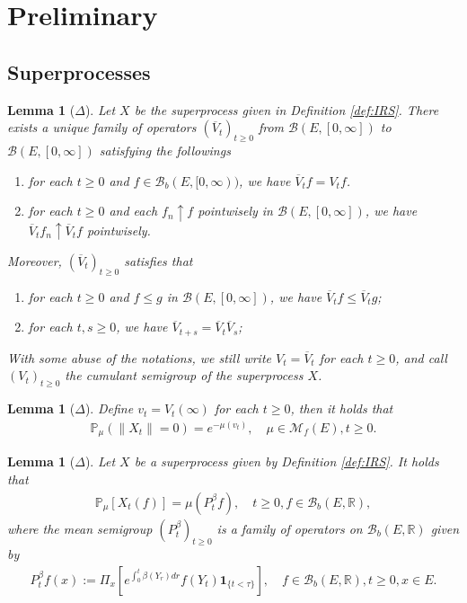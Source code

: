 \documentclass[12pt,a4paper]{amsart}
\numberwithin{equation}{section}
\theoremstyle{plain}
\newtheorem{lem}[thm]{Lemma}
\theoremstyle{definition}
\begin{document}
\section{Preliminary}
\subsection{Superprocesses}
  \begin{lem}[$\Delta$]
    \label{lem:ACP}
    Let $X$ be the superprocess given in Definition \ref{def:IRS}.
    There exists a unique family of operators $(\overline V_t)_{t \geq 0}$ from $\mathcal B(E, [0,\infty])$ to $\mathcal B(E, [0,\infty])$ satisfying the followings
    \begin{enumerate}[label=(\alph*)]
    \item
      for each $t\geq 0$ and $f \in \mathcal B_b(E, [0,\infty))$, we have $\overline V_tf = V_tf$.
    \item
      for each $t\geq 0$ and each $f_n \uparrow f$ pointwisely in $\mathcal B(E, [0,\infty])$, we have $\overline V_tf_n \uparrow \overline V_tf$ pointwisely.
    \end{enumerate}
    Moreover, $(\overline V_t)_{t\geq 0}$ satisfies that
    \begin{enumerate}
    \item
      for each $t\geq 0$ and $f\leq g$ in $\mathcal B(E,[0,\infty])$, we have $\overline V_tf \leq \overline V_tg$;
    \item
      for each $t, s\geq 0$, we have $\overline V_{t+s} = \overline V_t \overline V_s$;
    \end{enumerate}
    With some abuse of the notations, we still write $V_t = \overline V_t$ for each $t\geq 0$, and call $(V_t)_{t\geq 0}$ the \emph{cumulant semigroup} of the superprocess $X$.
  \end{lem}

  \begin{lem}[$\Delta$]
    \label{lem:PSE}
    Define $v_t = V_t(\infty)$ for each $t\geq 0$, then it holds that 
    \begin{align}
      \mathbb P_\mu (\|X_t\| = 0) 
      = e^{- \mu(v_t)}
      , \quad \mu \in \mathcal M_f(E), t\geq 0.
    \end{align}      
  \end{lem}
  
  \begin{lem}[$\Delta$]
    \label{lem:PSM}
    Let $X$ be a superprocess given by Definition \ref{def:IRS}. 
    It holds that
    \begin{align} 
      \mathbb P_\mu [X_t(f)] = \mu(P^\beta_t f), 
      \quad t \geq 0, f\in \mathcal B_b(E, \mathbb R),
    \end{align} 
    where \emph{the mean semigroup} $(P_t^\beta)_{t\geq 0}$ is a family of operators on $\mathcal B_b(E, \mathbb R)$ given by
    \begin{align}
      P^\beta_tf(x)
      := \Pi_x [e^{\int_0^{t} \beta(Y_r)dr} f(Y_t)\mathbf 1_{\{t<\tau\}}],
      \quad f \in \mathcal B_b(E, \mathbb R),t\geq 0, x\in E.
    \end{align}
  \end{lem}
\end{document}
